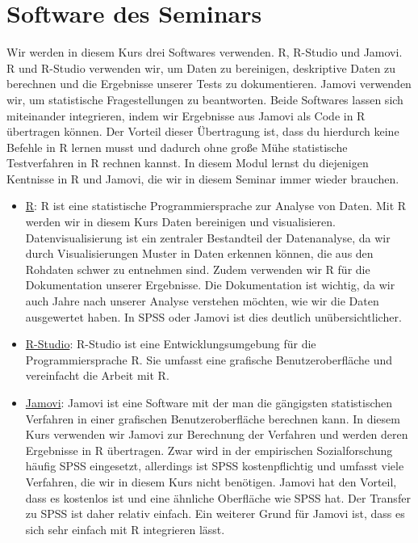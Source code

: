 \documentclass[
]{book}
\providecommand{\tightlist}{%
  \setlength{\itemsep}{0pt}\setlength{\parskip}{0pt}}
\begin{document}
\hypertarget{software-des-seminars}{%
\section{Software des Seminars}\label{software-des-seminars}}

Wir werden in diesem Kurs drei Softwares verwenden. R, R-Studio und Jamovi. R und R-Studio verwenden wir, um Daten zu bereinigen, deskriptive Daten zu berechnen und die Ergebnisse unserer Tests zu dokumentieren. Jamovi verwenden wir, um statistische Fragestellungen zu beantworten. Beide Softwares lassen sich miteinander integrieren, indem wir Ergebnisse aus Jamovi als Code in R übertragen können. Der Vorteil dieser Übertragung ist, dass du hierdurch keine Befehle in R lernen musst und dadurch ohne große Mühe statistische Testverfahren in R rechnen kannst. In diesem Modul lernst du diejenigen Kentnisse in R und Jamovi, die wir in diesem Seminar immer wieder brauchen.

\begin{itemize}
\tightlist
\item
  \href{https://www.r-project.org/}{R}: R ist eine statistische Programmiersprache zur Analyse von Daten. Mit R werden wir in diesem Kurs Daten bereinigen und visualisieren. Datenvisualisierung ist ein zentraler Bestandteil der Datenanalyse, da wir durch Visualisierungen Muster in Daten erkennen können, die aus den Rohdaten schwer zu entnehmen sind. Zudem verwenden wir R für die Dokumentation unserer Ergebnisse. Die Dokumentation ist wichtig, da wir auch Jahre nach unserer Analyse verstehen möchten, wie wir die Daten ausgewertet haben. In SPSS oder Jamovi ist dies deutlich unübersichtlicher.
\item
  \href{https://rstudio.com/}{R-Studio}: R-Studio ist eine Entwicklungsumgebung für die Programmiersprache R. Sie umfasst eine grafische Benutzeroberfläche und vereinfacht die Arbeit mit R.
\item
  \href{https://www.jamovi.org/}{Jamovi}: Jamovi ist eine Software mit der man die gängigsten statistischen Verfahren in einer grafischen Benutzeroberfläche berechnen kann. In diesem Kurs verwenden wir Jamovi zur Berechnung der Verfahren und werden deren Ergebnisse in R übertragen. Zwar wird in der empirischen Sozialforschung häufig SPSS eingesetzt, allerdings ist SPSS kostenpflichtig und umfasst viele Verfahren, die wir in diesem Kurs nicht benötigen. Jamovi hat den Vorteil, dass es kostenlos ist und eine ähnliche Oberfläche wie SPSS hat. Der Transfer zu SPSS ist daher relativ einfach. Ein weiterer Grund für Jamovi ist, dass es sich sehr einfach mit R integrieren lässt.
\end{itemize}
\end{document}
